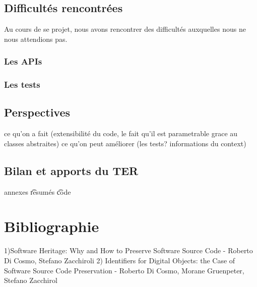 \documentclass[12pt,a4paper]{report}
\theoremstyle{definition}
\begin{document}
	\section{Difficultés rencontrées}
	Au cours de se projet, nous avons rencontrer des difficultés auxquelles nous ne nous attendions pas.
	\subsection{Les APIs}
	\subsection{Les tests}
	
	\section{Perspectives}
	ce qu'on a fait (extensibilité du code, le fait qu'il est parametrable grace au classes abstraites)
	ce qu'on peut améliorer (les tests? informations du context)
	\section{Bilan et apports du TER}	
annexes
\t resumés \t code	
\chapter*{Bibliographie}
1)Software Heritage: Why and How to Preserve Software Source Code - Roberto Di Cosmo, Stefano Zacchiroli
2) Identifiers for Digital Objects: the Case of Software Source Code Preservation - Roberto Di Cosmo, Morane Gruenpeter, Stefano Zacchirol
\end{document}
